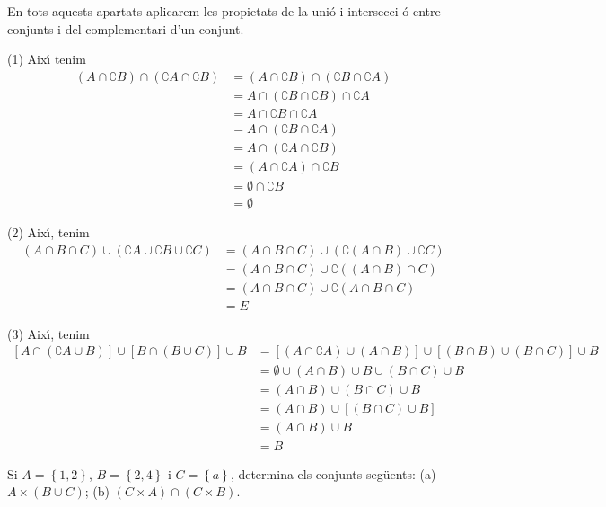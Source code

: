\begin{solucio}
En tots aquests apartats aplicarem les propietats de la uni\'{o} i intersecci%
\'{o} entre conjunts i del complementari d'un conjunt.

(1) Aix\'{\i} tenim%
\begin{align*}
(A\cap \complement B)\cap (\complement A\cap \complement B)& =(A\cap
\complement B)\cap (\complement B\cap \complement A) \\
& =A\cap (\complement B\cap \complement B)\cap \complement A \\
& =A\cap \complement B\cap \complement A \\
& =A\cap (\complement B\cap \complement A) \\
& =A\cap (\complement A\cap \complement B) \\
& =(A\cap \complement A)\cap \complement B \\
& =\emptyset \cap \complement B \\
& =\emptyset
\end{align*}

(2) Aix\'{\i}, tenim%
\begin{align*}
(A\cap B\cap C)\cup (\complement A\cup \complement B\cup \complement C)&
=(A\cap B\cap C)\cup (\complement \left( A\cap B\right) \cup \complement C)
\\
& =(A\cap B\cap C)\cup \complement \left( (A\cap B)\cap C\right) \\
& =(A\cap B\cap C)\cup \complement \left( A\cap B\cap C\right) \\
& =E
\end{align*}

(3) Aix\'{\i}, tenim%
\begin{align*}
\left[ A\cap (\complement A\cup B)\right] \cup \left[ B\cap (B\cup C)\right]
\cup B& =\left[ (A\cap \complement A)\cup (A\cap B)\right] \cup \left[
(B\cap B)\cup (B\cap C)\right] \cup B \\
& =\emptyset \cup (A\cap B)\cup B\cup (B\cap C)\cup B \\
& =(A\cap B)\cup (B\cap C)\cup B \\
& =(A\cap B)\cup \left[ (B\cap C)\cup B\right] \\
& =(A\cap B)\cup B \\
& =B
\end{align*}
\end{solucio}

\begin{exercici}
Si $A=\left\{ 1,2\right\} $, $B=\left\{ 2,4\right\} $ i $C=\left\{ a\right\}
$, determina els conjunts seg\"{u}ents: (a) $A\times (B\cup C)$; (b) $%
(C\times A)\cap (C\times B)$.
\end{exercici}

